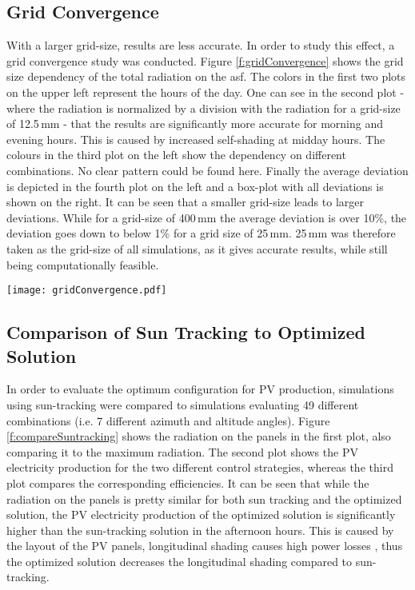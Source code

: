 	\subsection{Grid Convergence}

		With a larger grid-size, results are less accurate. In order to study this effect, a grid convergence study was conducted. Figure \ref{f:gridConvergence} shows the grid size dependency of the total radiation on the asf. The colors in the first two plots on the upper left represent the hours of the day. One can see in the second plot - where the radiation is normalized by a division with the radiation for a grid-size of 12.5\,mm - that the results are significantly more accurate for morning and evening hours. This is caused by increased self-shading at midday hours. The colours in the third plot on the left show the dependency on different combinations. No clear pattern could be found here. Finally the average deviation is depicted in the fourth plot on the left and a box-plot with all deviations is shown on the right. It can be seen that a smaller grid-size leads to larger deviations. While for a grid-size of 400\,mm the average deviation is over 10\%, the deviation goes down to below 1\% for a grid size of 25\,mm. 25\,mm was therefore taken as the grid-size of all simulations, as it gives accurate results, while still being computationally feasible. 

		\begin{figure*}
			\begin{center}
			\texttt{[image: gridConvergence.pdf]}
			\caption{Grid convergence evaluation}
			\label{f:gridConvergence}
			\end{center}
		\end{figure*}

	\subsection{Comparison of Sun Tracking to Optimized Solution}
	\label{ss:compareSunTracking}

		In order to evaluate the optimum configuration for PV production, simulations using sun-tracking were compared to simulations evaluating 49 different combinations (i.e. 7 different azimuth and altitude angles). Figure \ref{f:compareSuntracking} shows the radiation on the panels in the first plot, also comparing it to the maximum radiation. The second plot shows the PV electricity production for the two different control strategies, whereas the third plot compares the corresponding efficiencies. It can be seen that while the radiation on the panels is pretty similar for both sun tracking and the optimized solution, the PV electricity production of the optimized solution is significantly higher than the sun-tracking solution in the afternoon hours. This is caused by the layout of the PV panels, longitudinal shading causes high power losses \cite{hofer2015PVSEC}, thus the optimized solution decreases the longitudinal shading compared to sun-tracking. 

